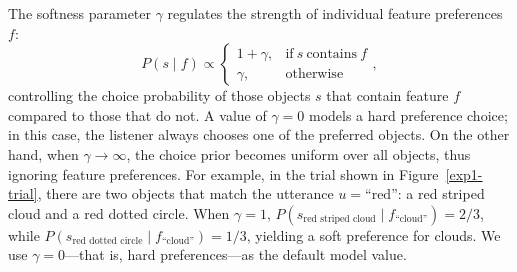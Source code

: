 \documentclass[11pt,a4paper]{article}
\begin{document}
The softness parameter $\gamma$ regulates the strength of individual feature preferences $f$:
\begin{equation}
	P(s \mid f) \propto \begin{cases}
		1 + \gamma, & \text{if}\ s\ \text{contains}\ f \\
		\gamma, & \text{otherwise}
	\end{cases},
\end{equation}
controlling the choice probability of those objects $s$ that contain feature $f$ compared to those that do not.  
A value of $\gamma=0$ models a hard preference choice; in this case, the listener always chooses one of the preferred objects. 
On the other hand, when $\gamma \rightarrow \infty$, the choice prior becomes uniform over all objects, thus ignoring feature preferences. 
For example, in the trial shown in Figure~\ref{exp1-trial}, there are two objects that match the utterance $u=\text{``red''}$: a red striped cloud and a red dotted circle.
When $\gamma=1$, $P(s_{\textrm{red\ striped\ cloud}}\mid f_{\textrm{``cloud''}}) = 2/3$, while
$P(s_{\textrm{red\ dotted\ circle}}\mid f_{\textrm{``cloud''}})= 1/3$, yielding a soft preference for clouds.
We use $\gamma=0$---that is, hard preferences---as the default model value.
\end{document}
